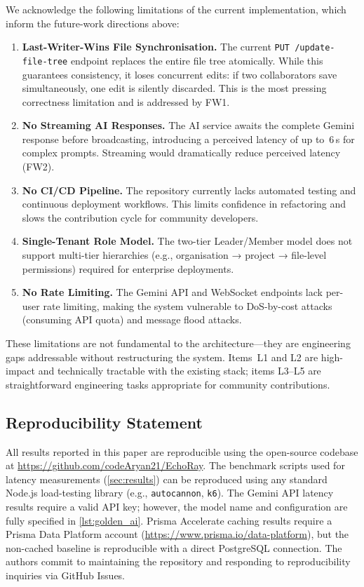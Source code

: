 We acknowledge the following limitations of the current \echoray{}
implementation, which inform the future-work directions above:

\begin{enumerate}[leftmargin=*, label=\textbf{L\arabic*.}]
  \item \textbf{Last-Writer-Wins File Synchronisation.} The current
    \texttt{PUT /update-file-tree} endpoint replaces the entire file tree
    atomically. While this guarantees consistency, it loses concurrent edits:
    if two collaborators save simultaneously, one edit is silently discarded.
    This is the most pressing correctness limitation and is addressed by FW1.
  \item \textbf{No Streaming AI Responses.} The AI service awaits the complete
    Gemini response before broadcasting, introducing a perceived latency of up
    to~6\,s for complex prompts. Streaming would dramatically reduce perceived
    latency (FW2).
  \item \textbf{No CI/CD Pipeline.} The repository currently lacks automated
    testing and continuous deployment workflows. This limits confidence in
    refactoring and slows the contribution cycle for community developers.
  \item \textbf{Single-Tenant Role Model.} The two-tier Leader/Member model
    does not support multi-tier hierarchies (e.g., organisation → project →
    file-level permissions) required for enterprise deployments.
  \item \textbf{No Rate Limiting.} The Gemini API and WebSocket endpoints lack
    per-user rate limiting, making the system vulnerable to DoS-by-cost attacks
    (consuming API quota) and message flood attacks.
\end{enumerate}

These limitations are not fundamental to the architecture---they are
engineering gaps addressable without restructuring the system. Items~L1 and
L2 are high-impact and technically tractable with the existing stack; items
L3--L5 are straightforward engineering tasks appropriate for community
contributions.

\subsection{Reproducibility Statement}
\label{sub:reproducibility}

All results reported in this paper are reproducible using the open-source
codebase at \url{https://github.com/codeAryan21/EchoRay}. The benchmark
scripts used for latency measurements (\cref{sec:results}) can be reproduced
using any standard Node.js load-testing library (e.g., \texttt{autocannon},
\texttt{k6}). The Gemini API latency results require a valid API key; however,
the model name and configuration are fully specified in \cref{lst:golden_ai}.
Prisma Accelerate caching results require a Prisma Data Platform account
(\url{https://www.prisma.io/data-platform}), but the non-cached baseline is
reproducible with a direct PostgreSQL connection. The authors commit to
maintaining the repository and responding to reproducibility inquiries via
GitHub Issues.
